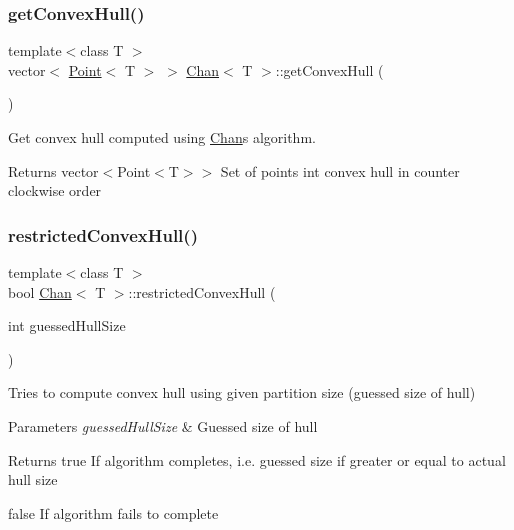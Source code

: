 \subsubsection{\texorpdfstring{get\+Convex\+Hull()}{getConvexHull()}}
{\footnotesize\ttfamily template$<$class T $>$ \\
vector$<$ \mbox{\hyperlink{classPoint}{Point}}$<$ T $>$ $>$ \mbox{\hyperlink{classChan}{Chan}}$<$ T $>$\+::get\+Convex\+Hull (\begin{DoxyParamCaption}{ }\end{DoxyParamCaption})}



Get convex hull computed using \mbox{\hyperlink{classChan}{Chan}}\textquotesingle{}s algorithm. 

\begin{DoxyReturn}{Returns}
vector$<$Point$<$\+T$>$$>$ Set of points int convex hull in counter clockwise order 
\end{DoxyReturn}

\begin{DoxyCode}{0}

\end{DoxyCode}
\mbox{\label{classChan_a773b2ebe27132ccfacedd5efebd63093}} 
\subsubsection{\texorpdfstring{restricted\+Convex\+Hull()}{restrictedConvexHull()}}
{\footnotesize\ttfamily template$<$class T $>$ \\
bool \mbox{\hyperlink{classChan}{Chan}}$<$ T $>$\+::restricted\+Convex\+Hull (\begin{DoxyParamCaption}\item[{int}]{guessed\+Hull\+Size }\end{DoxyParamCaption})\hspace{0.3cm}{\ttfamily [private]}}



Tries to compute convex hull using given partition size (guessed size of hull) 


\begin{DoxyParams}{Parameters}
{\em guessed\+Hull\+Size} & Guessed size of hull \\
\hline
\end{DoxyParams}
\begin{DoxyReturn}{Returns}
true If algorithm completes, i.\+e. guessed size if greater or equal to actual hull size 

false If algorithm fails to complete 
\end{DoxyReturn}

